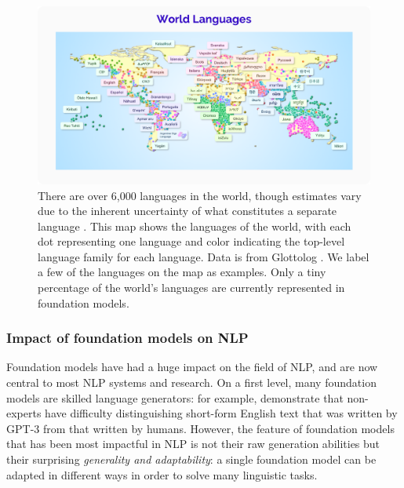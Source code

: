 \begin{figure}[t]
\centering
\includegraphics[width=\textwidth]{capabilities/figures/Language_1.png}
\caption{\label{fig:language_1}
There are over 6,000 languages in the world, though estimates vary due to the inherent uncertainty of what constitutes a separate language \citep{nordhoff2011glottolog}. This map shows the languages of the world, with each dot representing one language and color indicating the top-level language family for each language. Data is from Glottolog \cite{glottolog}. We label a few of the languages on the map as examples. Only a tiny percentage of the world's languages are currently represented in foundation models.}
\end{figure}

\subsubsection{Impact of foundation models on NLP}

Foundation models have had a huge impact on the field of NLP, and are now central to most NLP systems and research. On a first level, many foundation models are skilled language generators: for example, \citet{clark2021all} demonstrate that non-experts have difficulty distinguishing short-form English text that was written by GPT-3 from that written by humans. However, the feature of foundation models that has been most impactful in NLP is not their raw generation abilities but their surprising \textit{generality and adaptability}: a single foundation model can be adapted in different ways in order to solve many linguistic tasks.  

